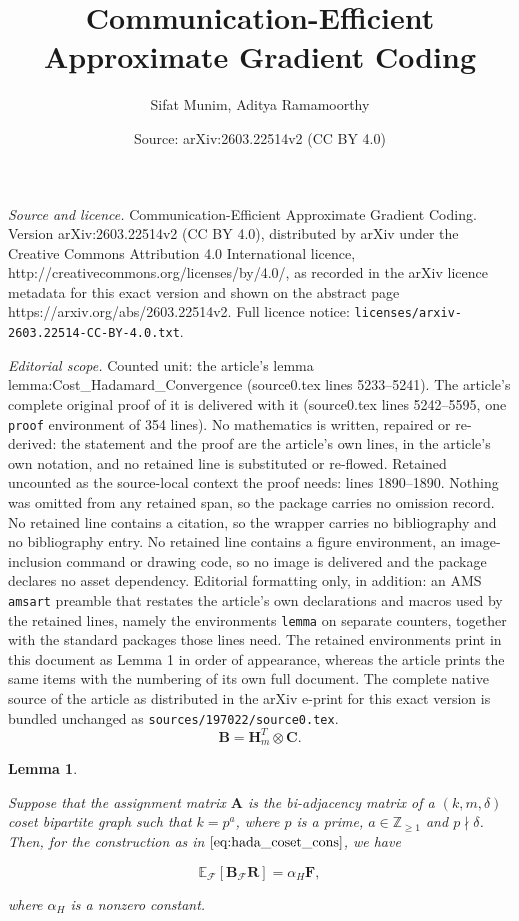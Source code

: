 \documentclass[10pt,a4paper]{amsart}
\title{Communication-Efficient Approximate Gradient Coding}
\author{Sifat Munim, Aditya Ramamoorthy}
\date{Source: arXiv:2603.22514v2 (CC BY 4.0)}
\newtheorem{lemma}{Lemma}
\newcommand{\cF}{\mathcal{F}}
\begin{document}
\maketitle

\noindent\emph{Source and licence.} Communication-Efficient Approximate Gradient Coding. Version arXiv:2603.22514v2 (CC BY 4.0), distributed by arXiv under the Creative Commons Attribution 4.0 International licence, http://creativecommons.org/licenses/by/4.0/, as recorded in the arXiv licence metadata for this exact version and shown on the abstract page https://arxiv.org/abs/2603.22514v2. Full licence notice: \texttt{licenses/arxiv-2603.22514-CC-BY-4.0.txt}.\par\smallskip

\noindent\textit{Editorial scope.} Counted unit: the article's lemma lemma:Cost\_Hadamard\_Convergence (source0.tex lines 5233--5241). The article's complete original proof of it is delivered with it (source0.tex lines 5242--5595, one \texttt{proof} environment of 354 lines). No mathematics is written, repaired or re-derived: the statement and the proof are the article's own lines, in the article's own notation, and no retained line is substituted or re-flowed.  Retained uncounted as the source-local context the proof needs: lines 1890--1890.  Nothing was omitted from any retained span, so the package carries no omission record.  No retained line contains a citation, so the wrapper carries no bibliography and no bibliography entry.  No retained line contains a figure environment, an image-inclusion command or drawing code, so no image is delivered and the package declares no asset dependency.  Editorial formatting only, in addition: an AMS \texttt{amsart} preamble that restates the article's own declarations and macros used by the retained lines, namely the environments \texttt{lemma} on separate counters, together with the standard packages those lines need.  The retained environments print in this document as Lemma 1 in order of appearance, whereas the article prints the same items with the numbering of its own full document.  The complete native source of the article as distributed in the arXiv e-print for this exact version is bundled unchanged as \texttt{sources/197022/source0.tex}.
\begin{equation} \label{eq:hada_coset_cons} \mathbf{B}=\mathbf{H}_m^T\otimes\mathbf{C}. \end{equation} 

\begin{lemma}
\label{lemma:Cost_Hadamard_Convergence}

Suppose that the assignment matrix $\mathbf{A}$ is the bi-adjacency matrix of a $(k, m, \delta)$ coset bipartite graph such that $k = p^a$, where $p$ is a prime, $a \in \mathbb{Z}_{\ge 1}$ and $p \nmid \delta$. Then, for the construction as in $\eqref{eq:hada_coset_cons}$, we have 

\[\mathbb{E}_{\mathcal{F}}[\mathbf{B}_{\cF} \mathbf{R}]= \alpha_H \mathbf{F},\]

where $\alpha_H$ is a nonzero constant.
\end{lemma}
\end{document}
